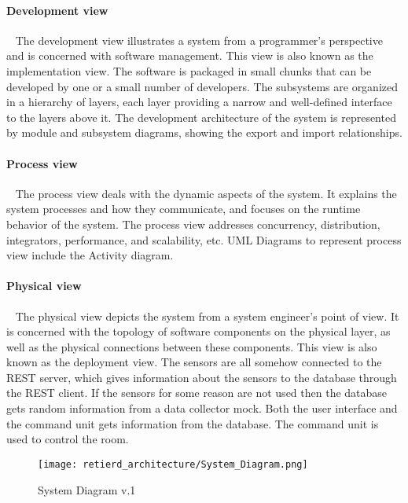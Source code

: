\documentclass[../document]{subfiles}
\begin{document}
\paragraph{Development view} \ \newline
The development view illustrates a system from a programmer's perspective and is concerned with software management. This view is also known as the implementation view. The software is packaged in small chunks that can be developed by one or a small number of developers. The subsystems are organized in a hierarchy of layers, each layer providing a narrow and well-defined interface to the layers above it. The development architecture of the system is represented by module and subsystem diagrams, showing the export and import relationships. 
 

\paragraph{Process view} \ \newline
The process view deals with the dynamic aspects of the system. It explains the system processes and how they communicate, and focuses on the runtime behavior of the system. The process view addresses concurrency, distribution, integrators, performance, and scalability, etc. UML Diagrams to represent process view include the Activity diagram.


\paragraph{Physical view} \ \newline
The physical view depicts the system from a system engineer's point of view. It is concerned with the topology of software components on the physical layer, as well as the physical connections between these components. This view is also known as the deployment view. The sensors are all somehow connected to the REST server, which gives information about the sensors to the database through the REST client. If the sensors for some reason are not used then the database gets random information from a data collector mock. Both the user interface and the command unit gets information from the database. The command unit is used to control the room. 

\begin{figure}[H]
	\centering
	\texttt{[image: retierd\_architecture/System\_Diagram.png]}
	\caption{System Diagram v.1}
\end{figure}
\end{document}
